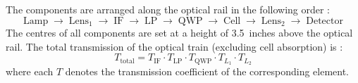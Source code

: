 The components are arranged along the optical rail in the following order :
\begin{equation*}
    \text{Lamp} \;\to\;
    \text{Lens}_1 \;\to\;
    \text{IF} \;\to\;
    \text{LP} \;\to\;
    \text{QWP} \;\to\;
    \text{Cell} \;\to\;
    \text{Lens}_2 \;\to\;
    \text{Detector}
\end{equation*}
The centres of all components are set at a height of 3.5~inches above the optical rail.
The total transmission of the optical train (excluding cell absorption) is :
\begin{equation}
    T_{\text{total}} = T_{\text{IF}} \cdot T_{\text{LP}} \cdot T_{\text{QWP}}
    \cdot T_{L_1} \cdot T_{L_2}
\end{equation}
where each $T$ denotes the transmission coefficient of the corresponding element.